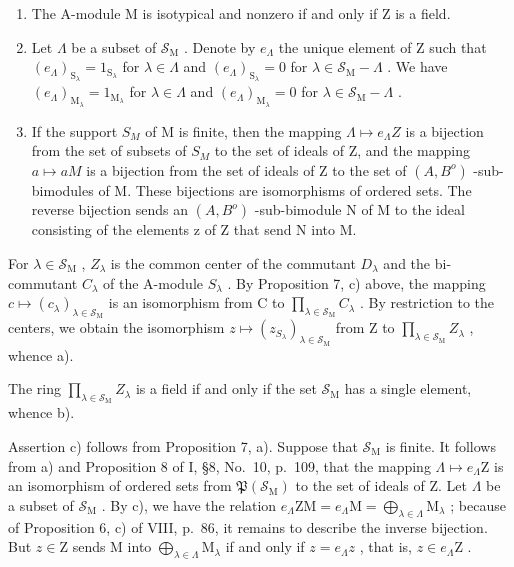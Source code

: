 \begin{enumerate}
\def\labelenumi{\alph{enumi})}
\setcounter{enumi}{1}
\item
  The A-module M is isotypical and nonzero if and only if Z is a field.
\item
  Let \(\Lambda\) be a subset of \(\mathcal{S}_{\mathrm{M}}\) . Denote by \(e_{\Lambda}\) the unique element of \(\mathrm{Z}\) such that \((e_{\Lambda})_{\mathrm{S}_{\lambda}} = 1_{\mathrm{S}_{\lambda}}\) for \(\lambda \in \Lambda\) and \((e_{\Lambda})_{\mathrm{S}_{\lambda}} = 0\) for \(\lambda \in \mathcal{S}_{\mathrm{M}} - \Lambda\) . We have \((e_{\Lambda})_{\mathrm{M}_{\lambda}} = 1_{\mathrm{M}_{\lambda}}\) for \(\lambda \in \Lambda\) and \((e_{\Lambda})_{\mathrm{M}_{\lambda}} = 0\) for \(\lambda \in \mathcal{S}_{\mathrm{M}} - \Lambda\) .
\item
  If the support \(S_{M}\) of M is finite, then the mapping \(\Lambda \mapsto e_{\Lambda}Z\) is a bijection from the set of subsets of \(S_{M}\) to the set of ideals of Z, and the mapping \(a \mapsto aM\) is a bijection from the set of ideals of Z to the set of \((A,B^{o})\) -sub-bimodules of M. These bijections are isomorphisms of ordered sets. The reverse bijection sends an \((A,B^{o})\) -sub-bimodule N of M to the ideal consisting of the elements z of Z that send N into M.
\end{enumerate}

For \(\lambda \in \mathcal{S}_{\mathrm{M}}\) , \(Z_{\lambda}\) is the common center of the commutant \(D_{\lambda}\) and the bi-commutant \(C_{\lambda}\) of the A-module \(S_{\lambda}\) . By Proposition 7, c) above, the mapping \(c \mapsto (c_{\lambda})_{\lambda \in \mathcal{S}_{\mathrm{M}}}\) is an isomorphism from C to \(\prod_{\lambda \in \mathcal{S}_{\mathrm{M}}} C_{\lambda}\) . By restriction to the centers, we obtain the isomorphism \(z \mapsto (z_{S_{\lambda}})_{\lambda \in \mathcal{S}_{\mathrm{M}}}\) from Z to \(\prod_{\lambda \in \mathcal{S}_{\mathrm{M}}} Z_{\lambda}\) , whence a).

The ring \(\prod_{\lambda \in \mathcal{S}_{\mathrm{M}}}Z_{\lambda}\) is a field if and only if the set \(\mathcal{S}_{\mathrm{M}}\) has a single element, whence b).

Assertion c) follows from Proposition 7, a). Suppose that \(\mathcal{S}_{\mathrm{M}}\) is finite. It follows from a) and Proposition 8 of I, §8, No.~10, p.~109, that the mapping \(\Lambda \mapsto e_{\Lambda}\mathrm{Z}\) is an isomorphism of ordered sets from \(\mathfrak{P}(\mathcal{S}_{\mathrm{M}})\) to the set of ideals of Z. Let \(\Lambda\) be a subset of \(\mathcal{S}_{\mathrm{M}}\) . By c), we have the relation \(e_{\Lambda}\mathrm{ZM} = e_{\Lambda}\mathrm{M} = \bigoplus_{\lambda \in \Lambda}\mathrm{M}_{\lambda}\) ; because of Proposition 6, c) of VIII, p.~86, it remains to describe the inverse bijection. But \(z \in \mathrm{Z}\) sends M into \(\bigoplus_{\lambda \in \Lambda}\mathrm{M}_{\lambda}\) if and only if \(z = e_{\Lambda}z\) , that is, \(z \in e_{\Lambda}\mathrm{Z}\) .


